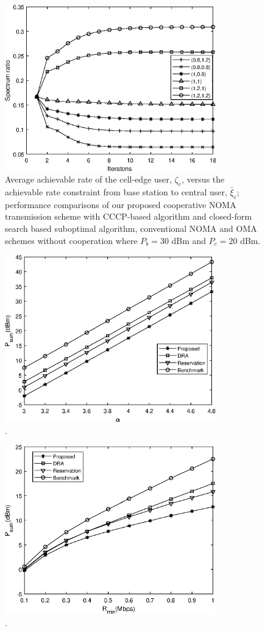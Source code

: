 \documentclass[journal]{IEEEtran}
\begin{document}
\begin{figure}
	\centering
	\includegraphics[width=3.6in]{SR_convergence.eps}
	\caption{Average achievable rate of the cell-edge user, $\zeta_e$, versus the achievable rate constraint from base station to central user, $\bar{\xi}_c$; performance comparisons of our proposed cooperative NOMA transmission scheme with CCCP-based algorithm and closed-form search based suboptimal algorithm, conventional NOMA and OMA schemes without cooperation where $P_b=30$ dBm and $P_c=20$ dBm.}
\end{figure}

\begin{figure}
	\centering
	\includegraphics[width=3.6in]{P_alpha.eps}
	\caption{.}
\end{figure}

\begin{figure}
	\centering
	\includegraphics[width=3.6in]{P_rmin.eps}
	\caption{.}
\end{figure}
\end{document}
